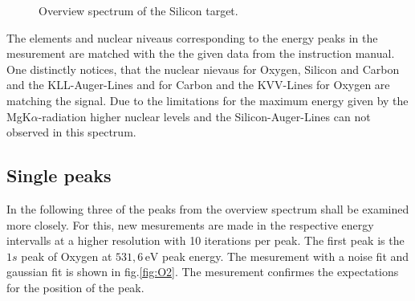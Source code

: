 \documentclass[numbers=noenddot,a4paper]{article}
\begin{document}
	\begin{figure}[h]
		\centering
		\caption{Overview spectrum of the Silicon target.}\label{fig:all}
	\end{figure}
	The elements and nuclear niveaus corresponding to the energy peaks in the mesurement are matched with the the given data from the instruction manual. One distinctly notices, that the nuclear nievaus for Oxygen, Silicon and Carbon and the KLL-Auger-Lines and for Carbon and the KVV-Lines for Oxygen are matching the signal. Due to the limitations for the maximum energy given by the MgK$\alpha$-radiation higher nuclear levels and the Silicon-Auger-Lines can not observed in this spectrum.\\
	
	\subsection{Single peaks}
	
	In the following three of the peaks from the overview spectrum shall be examined more closely. For this, new mesurements are made in the respective energy intervalls at a higher resolution with 10 iterations per peak. The first peak is the $1s$ peak of Oxygen at $531,6\,\mathrm{eV}$ peak energy. The mesurement with a noise fit and gaussian fit is shown in fig.\ref{fig:O2}. The mesurement confirmes the expectations for the position of the peak.\\
	
\end{document}
